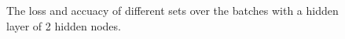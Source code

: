 \documentclass{article} %
\begin{document}
\begin{figure} [!htbp]
	
	\caption{The loss and accuacy of different sets over the batches with a hidden layer of 2 hidden nodes. }  
	\label{Figure: 2}
\end{figure}
\end{document}
